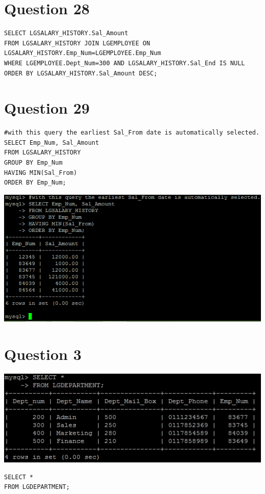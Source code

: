 \documentclass[a4paper,10pt]{article}
\begin{document}
\section {Question 28}
\lstset{
            language=SQL,
            breaklines=true
            }
        \begin{lstlisting}[frame=single]
        SELECT LGSALARY_HISTORY.Sal_Amount
FROM LGSALARY_HISTORY JOIN LGEMPLOYEE ON LGSALARY_HISTORY.Emp_Num=LGEMPLOYEE.Emp_Num
WHERE LGEMPLOYEE.Dept_Num=300 AND LGSALARY_HISTORY.Sal_End IS NULL
ORDER BY LGSALARY_HISTORY.Sal_Amount DESC;

        \end{lstlisting}
\section {Question 29}
\lstset{
            language=SQL,
            breaklines=true
            }
        \begin{lstlisting}[frame=single]
        #with this query the earliest Sal_From date is automatically selected.
SELECT Emp_Num, Sal_Amount
FROM LGSALARY_HISTORY
GROUP BY Emp_Num
HAVING MIN(Sal_From)
ORDER BY Emp_Num;

        \end{lstlisting}
\includegraphics{Queries/Question_29/Question_29_screenshot.PNG}
\section {Question 3}
\includegraphics{Queries/Question_3/Q3_screenshot.jpg}
\lstset{
            language=SQL,
            breaklines=true
            }
        \begin{lstlisting}[frame=single]
        SELECT *
FROM LGDEPARTMENT;

        \end{lstlisting}
\end{document}
